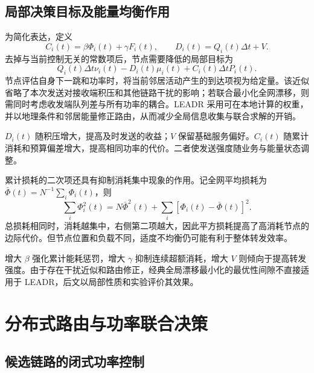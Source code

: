 \subsection{局部决策目标及能量均衡作用}

为简化表达，定义
\begin{equation}
 C_i(t)=\beta\Phi_i(t)+\gamma F_i(t),\qquad
 D_i(t)=Q_i(t)\Delta t+V.
 \label{rq1:eq:coefficients}
\end{equation}
去掉与当前控制无关的常数项后，节点需要降低的局部目标为
\begin{equation}
 Q_i(t)\Delta t\nu_i(t)-D_i(t)\mu_i(t)+C_i(t)\Delta tP_i(t).
 \label{rq1:eq:local_objective}
\end{equation}
节点评估自身下一跳和功率时，将当前邻居活动产生的到达项视为给定量。该近似省略了本次发送对接收端积压和其他链路干扰的影响；若联合最小化全网漂移，则需同时考虑收发端队列差与所有功率的耦合。LEADR 采用可在本地计算的权重，并以地理条件和邻居能量修正路由，从而减少全局信息收集与联合求解的开销。

$D_i(t)$ 随积压增大，提高及时发送的收益；$V$ 保留基础服务偏好。$C_i(t)$ 随累计消耗和预算偏差增大，提高相同功率的代价。二者使发送强度随业务与能量状态调整。

累计损耗的二次项还具有抑制消耗集中现象的作用。记全网平均损耗为 $\bar\Phi(t)=N^{-1}\sum_i\Phi_i(t)$，则
\begin{equation}
 \sum_i\Phi_i^2(t)=N\bar\Phi^2(t)
                  +\sum_i[\Phi_i(t)-\bar\Phi(t)]^2.
 \label{rq1:eq:energy_variance_identity}
\end{equation}
总损耗相同时，消耗越集中，右侧第二项越大，因此平方损耗提高了高消耗节点的边际代价。但节点位置和负载不同，适度不均衡仍可能有利于整体转发效率。

增大 $\beta$ 强化累计能耗惩罚，增大 $\gamma$ 抑制连续超额消耗，增大 $V$ 则倾向于提高转发强度。由于存在干扰近似和路由修正，经典全局漂移最小化的最优性间隙不直接适用于 LEADR，后文以局部性质和实验评价其效果。

\section{分布式路由与功率联合决策}
\label{rq1:sec:algorithm}

\subsection{候选链路的闭式功率控制}

